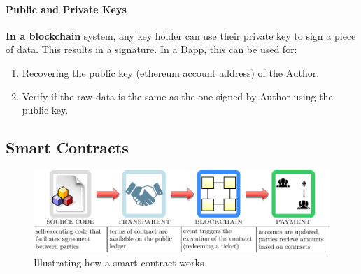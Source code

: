 	
	\paragraph{Public and Private Keys}
	 \textbf{In a blockchain} system, any key holder can use their private key to sign a piece of data. This results in a signature.  
	  In a Dapp, this can be used for:
	 \begin{enumerate}
		\item Recovering the public key (ethereum account address) of the Author.
		\item Verify if the raw data is the same as the one signed by Author using the public key. 
	\end{enumerate}
	
	
	
	
	
		 


\subsection{Smart Contracts}
	\begin{warpprint}
	\begin{figure}[ht]
		\centering
		\includegraphics[width=1\linewidth]{Diagrams/smartContractsExp.pdf}
		\caption{Illustrating how a smart contract works}
		\label{fig:smartContracts}
	\end{figure}
	\end{warpprint}
	

